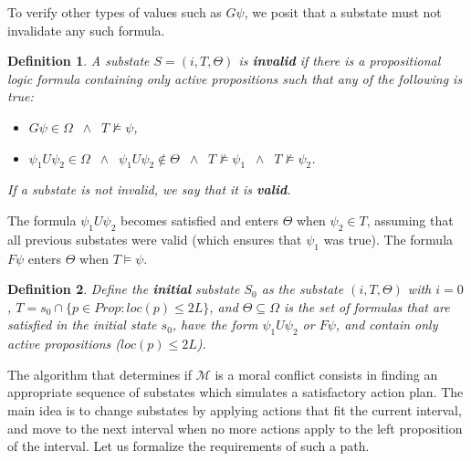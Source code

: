 \documentclass[]{jair}
\newtheorem{Definition}{Definition}
\begin{document}

To verify other types of values such as $G\psi$, we posit that a substate must not invalidate any such formula.

\begin{Definition}\label{invalid}
A substate $S = (i, T, \Theta)$ is {\bf invalid} if there is a propositional logic formula
containing only active propositions such that any of the following is true: 
\begin{itemize}
    \item $G\psi\in\Omega\;\;\land\;\; T\not\models\psi$,
    \item $\psi_1 U \psi_2 \in\Omega\;\;\land\;\; \psi_1 U\psi_2 \notin \Theta \;\;\land\;\; T\not\models \psi_1 \;\;\land\; \;T\not\models\psi_2$.
\end{itemize}
If a substate is not invalid, we say that it is {\bf valid}.
\end{Definition}

The formula $\psi_1 U \psi_2$ becomes satisfied and enters $\Theta$ when 
$\psi_2\in T$, assuming that all previous substates were valid (which ensures that $\psi_1$ was true).
The formula $F\psi$ enters $\Theta$ when $T\models \psi$.

\begin{Definition}
 Define the {\bf initial} substate $S_0$ as the substate $(i,T,\Theta)$ with $i=0$, 
$T=s_0 \cap \{p\in Prop : loc(p)\le 2L\}$, and $\Theta\subseteq \Omega$ is the set of
    formulas that are satisfied in the initial state $s_0$, have the form $\psi_1 U \psi_2$ or $F\psi$, and contain only active propositions ($loc(p)\le 2L$).
\end{Definition}

The algorithm that determines if $\mathcal{M}$ is a moral conflict consists in finding an appropriate sequence
of substates which simulates a satisfactory action plan. The main idea is to change substates by applying actions that fit the current interval, and move to the next interval when no more actions apply to the left proposition of the interval. Let us formalize the requirements of such a path.
\end{document}
